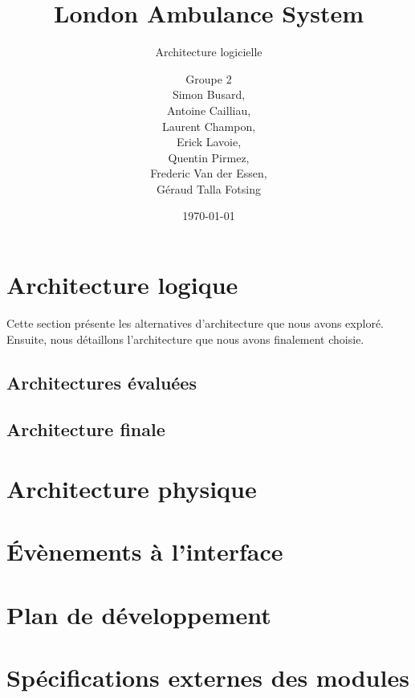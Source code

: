 \documentclass{report}
\title{London Ambulance System}
\subtitle{Architecture logicielle}
\author{\normalsize{Groupe 2}\\
\footnotesize{
Simon Busard, \\
Antoine Cailliau, \\
Laurent Champon,\\
Erick Lavoie, \\
Quentin Pirmez,\\
Frederic Van der Essen, \\
Géraud Talla Fotsing}}
\date{\today}
\begin{document}
\setlength{\parskip}{1em}
\startdocument

\maketitle
\setcounter{tocdepth}{1}
\tableofcontents

\chapter{Architecture logique}
	
	Cette section présente les alternatives d'architecture que nous
	avons exploré. Ensuite, nous détaillons l'architecture que nous
	avons finalement choisie.

	\section{Architectures évaluées }
		
		
	
	\section{Architecture finale}
		

\chapter{Architecture physique}
	

\chapter{Évènements à l'interface}
	

\chapter{Plan de développement}
	

\chapter{Spécifications externes des modules}
\end{document}
